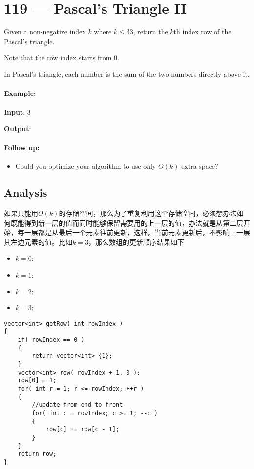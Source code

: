 \section{119 --- Pascal's Triangle II}
Given a non-negative index $k$ where $k \leq 33$, return the $k$th index row of the Pascal's triangle.

Note that the row index starts from 0.

In Pascal's triangle, each number is the sum of the two numbers directly above it.

\paragraph{Example:}

\begin{flushleft}

\textbf{Input}: 3

\textbf{Output}: \fcj{[1,3,3,1]}

\end{flushleft}


\paragraph{Follow up:}
\begin{itemize}
\item Could you optimize your algorithm to use only $O(k)$ extra space?
\end{itemize}

\subsection{Analysis}

如果只能用$O(k)$的存储空间，那么为了重复利用这个存储空间，必须想办法如何既能得到新一层的值而同时能够保留需要用的上一层的值，办法就是从第二层开始，每一层都是从最后一个元素往前更新，这样，当前元素更新后，不影响上一层其左边元素的值。比如$k=3$，那么数组的更新顺序结果如下

\begin{itemize}
\item $k=0$: \fcj{[1,0,0,0]}
\item $k=1$: \fcj{[1,1,0,0]}
\item $k=2$: \fcj{[1,2,1,0]}
\item $k=3$: \fcj{[1,3,3,1]}
\end{itemize}

\setcounter{lstlisting}{0}
\begin{lstlisting}[style=customc, caption={DP}]
vector<int> getRow( int rowIndex )
{
    if( rowIndex == 0 )
    {
        return vector<int> {1};
    }
    vector<int> row( rowIndex + 1, 0 );
    row[0] = 1;
    for( int r = 1; r <= rowIndex; ++r )
    {
        //update from end to front
        for( int c = rowIndex; c >= 1; --c )
        {
            row[c] += row[c - 1];
        }
    }
    return row;
}
\end{lstlisting}
